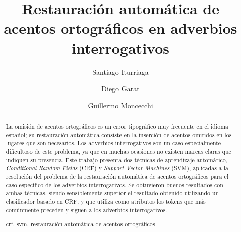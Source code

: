 \documentclass[runningheads,a4paper]{llncs}
\newcommand{\keywords}[1]{\par\addvspace\baselineskip
\noindent\keywordname\enspace\ignorespaces#1}
\begin{document}
\mainmatter  %

\title{Restauración automática de acentos ortográficos en adverbios interrogativos}


\author{Santiago Iturriaga \and Diego Garat \and Guillermo Moncecchi} 

%


\maketitle

\begin{abstract}
La omisión de acentos ortográficos es un error tipográfico muy frecuente en el idioma español; su restauración automática consiste en la inserción de acentos omitidos en los lugares que son necesarios. Los adverbios interrogativos son un caso especialmente dificultoso de este problema, ya que en muchas ocasiones no existen marcas claras que indiquen su presencia. Este trabajo presenta dos técnicas de aprendizaje automático, \emph{Conditional Random Fields} (CRF) y \emph{Support Vector Machines} (SVM), aplicadas a la resolución del problema de la restauración automática de acentos ortográficos para el caso específico de los adverbios interrogativos. Se obtuvieron buenos resultados con ambas técnicas, siendo sensiblemente superior el resultado obtenido utilizando un clasificador basado en CRF, y que utiliza como atributos los tokens que más comúnmente preceden y siguen a los adverbios interrogativos.
\keywords{crf, svm, restauración automática de acentos ortográficos}
\end{abstract}
\end{document}
